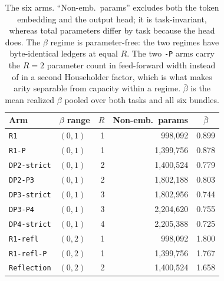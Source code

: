 \documentclass[10pt,twocolumn]{article}
\newcommand{\hd}[1]{\multicolumn{1}{c}{#1}}
\begin{document}
\begin{table}[t]
\centering
\footnotesize
\caption{The six arms. ``Non-emb.\ params'' excludes both the token embedding and
the output head; it is task-invariant, whereas total parameters differ by task
because the head does. The $\beta$ regime is parameter-free: the two regimes have
byte-identical ledgers at equal $R$. The two \texttt{-P} arms carry the $R{=}2$
parameter count in feed-forward width instead of in a second Householder factor,
which is what makes arity separable from capacity within a regime.
$\bar\beta$ is the mean realized $\beta$ pooled over both tasks and all six
bundles.}
\label{tab:arms}
\begin{tabular}{llrrr}
\toprule
Arm & $\beta$ range & \hd{$R$} & \hd{Non-emb.\ params} & \hd{$\bar\beta$} \\
\midrule
\texttt{R1}            & $(0,1)$ & 1 & 998{,}092     & 0.899 \\
\texttt{R1-P}          & $(0,1)$ & 1 & 1{,}399{,}756 & 0.878 \\
\texttt{DP2-strict}    & $(0,1)$ & 2 & 1{,}400{,}524 & 0.779 \\
\texttt{DP2-P3}        & $(0,1)$ & 2 & 1{,}802{,}188 & 0.803 \\
\texttt{DP3-strict}    & $(0,1)$ & 3 & 1{,}802{,}956 & 0.744 \\
\texttt{DP3-P4}        & $(0,1)$ & 3 & 2{,}204{,}620 & 0.755 \\
\texttt{DP4-strict}    & $(0,1)$ & 4 & 2{,}205{,}388 & 0.725 \\
\midrule
\texttt{R1-refl}       & $(0,2)$ & 1 & 998{,}092     & 1.800 \\
\texttt{R1-refl-P}     & $(0,2)$ & 1 & 1{,}399{,}756 & 1.767 \\
\texttt{Reflection}    & $(0,2)$ & 2 & 1{,}400{,}524 & 1.658 \\
\bottomrule
\end{tabular}
\end{table}
\end{document}
